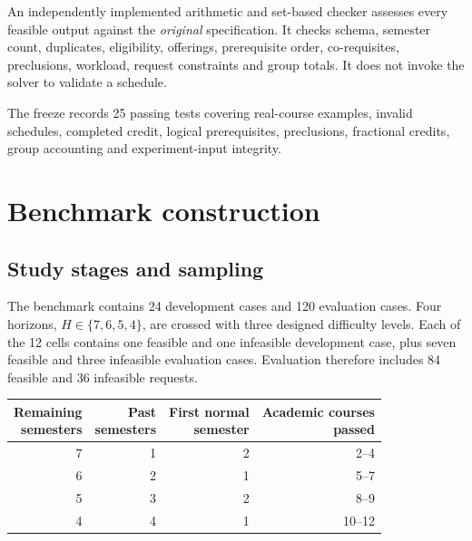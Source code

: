 \documentclass[11pt,a4paper]{article}
\begin{document}
An independently implemented arithmetic and set-based checker assesses every
feasible output against the \emph{original} specification. It checks schema,
semester count, duplicates, eligibility, offerings, prerequisite order,
co-requisites, preclusions, workload, request constraints and group totals.
It does not invoke the solver to validate a schedule.

The freeze records 25 passing tests covering real-course examples, invalid
schedules, completed credit, logical prerequisites, preclusions, fractional
credits, group accounting and experiment-input integrity.

\par
\section{Benchmark construction}
\subsection{Study stages and sampling}
The benchmark contains 24 development cases and 120 evaluation cases. Four
horizons, $H\in\{7,6,5,4\}$, are crossed with three designed difficulty levels.
Each of the 12 cells contains one feasible and one infeasible development
case, plus seven feasible and three infeasible evaluation cases. Evaluation
therefore includes 84 feasible and 36 infeasible requests.

\begin{center}
\begin{minipage}{\linewidth}
\centering
{}
\label{tab:stages}
\begin{tabular}{@{}rrrr@{}}
\toprule
\shortstack{Remaining\\semesters} & \shortstack{Past\\semesters} &
\shortstack{First normal\\semester} & \shortstack{Academic courses\\passed}\\
\midrule
7 & 1 & 2 & 2--4\\
6 & 2 & 1 & 5--7\\
5 & 3 & 2 & 8--9\\
4 & 4 & 1 & 10--12\\
\bottomrule
\end{tabular}
\end{minipage}
\end{center}
\end{document}
